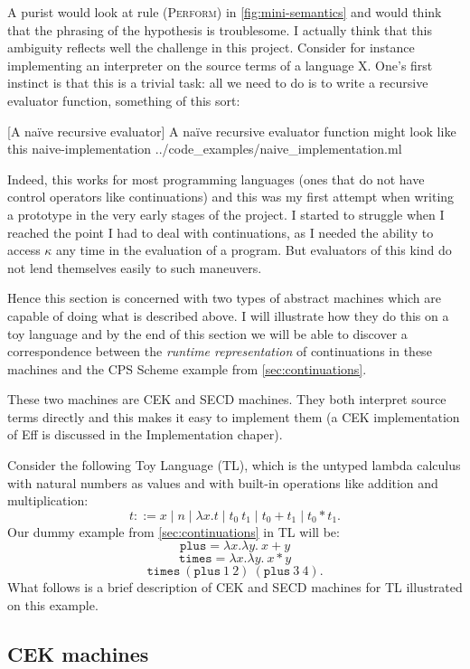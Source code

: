 \documentclass[class=article, crop=false]{standalone}
\begin{document}
A purist would look at rule \textsc{(Perform)} in \autoref{fig:mini-semantics}
and would think that the phrasing of the hypothesis is troublesome. I actually
think that this ambiguity reflects well the challenge in this project. Consider
for instance implementing an interpreter on the source terms of a language X.
One's first instinct is that this is a trivial task: all we need to do is to
write a recursive evaluator function, something of this sort:

{[A naïve recursive evaluator] A naïve recursive evaluator function might look like this}
{naive-implementation}
{../code_examples/naive_implementation.ml}

Indeed, this works for most programming languages (ones that do not have control
operators like continuations) and this was my first attempt when writing a
 prototype in the very early stages of the project. I started to struggle
when I reached the point I had to deal with continuations, as I needed the
ability to access $\kappa$ any time in the evaluation of a program. But
evaluators of this kind do not lend themselves easily to such maneuvers.

Hence this section is concerned with two types of abstract machines which are
capable of doing what is described above. I will illustrate how they do this on
a toy language and by the end of this section we will be able to discover a
correspondence between the \emph{runtime representation} of continuations in
these machines and the CPS Scheme example from \autoref{sec:continuations}.

These two machines are CEK and SECD machines. They both interpret source terms
directly and this makes it easy to implement them (a CEK implementation of Eff
is discussed in the Implementation chaper).

Consider the following Toy Language (TL), which is the untyped lambda calculus
with natural numbers as values and with built-in operations like addition and
multiplication:
$$ t ::= x \mid n \mid \lambda x. t \mid t_0\ t_1 \mid t_0 + t_1 \mid t_0 * t_1.$$
Our dummy example from \autoref{sec:continuations} in TL will be:
$$ \mathtt{plus} = \lambda x. \lambda y.\ x + y $$
$$ \mathtt{times} = \lambda x. \lambda y.\ x * y $$
$$ \mathtt{times}\ (\mathtt{plus}\ 1\ 2)\ (\mathtt{plus}\ 3\ 4).$$
What follows is a brief description of CEK and SECD machines for TL illustrated
on this example.

\subsection{CEK machines}
\end{document}
